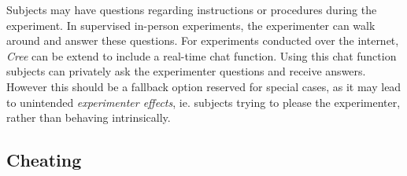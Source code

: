 \documentclass[preprint, 12pt]{elsarticle}
\newcommand{\Cree}{\emph{Cree}\xspace}
\begin{document}
Subjects may have questions regarding instructions or procedures during the experiment. In supervised in-person experiments, the experimenter can walk around and answer these questions. For experiments conducted over the internet, \Cree can be extend to include a real-time chat function. Using this chat function subjects can privately ask the experimenter questions and receive answers. However this should be a fallback option reserved for special cases, as it may lead to unintended \emph{experimenter effects}, ie. subjects trying to please the experimenter, rather than behaving intrinsically. %

\subsection{Cheating}
\end{document}
